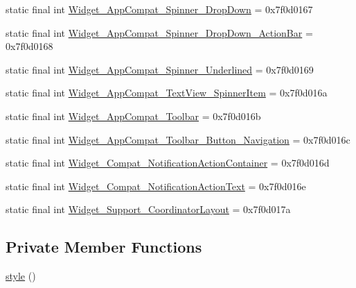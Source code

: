 \begin{DoxyCompactItemize}
\item 
static final int \mbox{\hyperlink{classandroid_1_1support_1_1v7_1_1appcompat_1_1_r_1_1style_a0911e8d3f56d1ceca6ee2f3e4dd58a57}{Widget\+\_\+\+App\+Compat\+\_\+\+Spinner\+\_\+\+Drop\+Down}} = 0x7f0d0167
\item 
static final int \mbox{\hyperlink{classandroid_1_1support_1_1v7_1_1appcompat_1_1_r_1_1style_a6190a954e4f0646a2b8de6530e0bcd72}{Widget\+\_\+\+App\+Compat\+\_\+\+Spinner\+\_\+\+Drop\+Down\+\_\+\+Action\+Bar}} = 0x7f0d0168
\item 
static final int \mbox{\hyperlink{classandroid_1_1support_1_1v7_1_1appcompat_1_1_r_1_1style_a185580641a1c211d234fd6a381680890}{Widget\+\_\+\+App\+Compat\+\_\+\+Spinner\+\_\+\+Underlined}} = 0x7f0d0169
\item 
static final int \mbox{\hyperlink{classandroid_1_1support_1_1v7_1_1appcompat_1_1_r_1_1style_ae78217806d80f6d12c6be69d442ec4aa}{Widget\+\_\+\+App\+Compat\+\_\+\+Text\+View\+\_\+\+Spinner\+Item}} = 0x7f0d016a
\item 
static final int \mbox{\hyperlink{classandroid_1_1support_1_1v7_1_1appcompat_1_1_r_1_1style_a09461e6cdfb963d2621f721c73f9c64d}{Widget\+\_\+\+App\+Compat\+\_\+\+Toolbar}} = 0x7f0d016b
\item 
static final int \mbox{\hyperlink{classandroid_1_1support_1_1v7_1_1appcompat_1_1_r_1_1style_ab210292245646fce123ac455b8fa3870}{Widget\+\_\+\+App\+Compat\+\_\+\+Toolbar\+\_\+\+Button\+\_\+\+Navigation}} = 0x7f0d016c
\item 
static final int \mbox{\hyperlink{classandroid_1_1support_1_1v7_1_1appcompat_1_1_r_1_1style_a1633e6362d69dd329e83c61ab99560f6}{Widget\+\_\+\+Compat\+\_\+\+Notification\+Action\+Container}} = 0x7f0d016d
\item 
static final int \mbox{\hyperlink{classandroid_1_1support_1_1v7_1_1appcompat_1_1_r_1_1style_a18e9124d71139940e68076f3be26805b}{Widget\+\_\+\+Compat\+\_\+\+Notification\+Action\+Text}} = 0x7f0d016e
\item 
static final int \mbox{\hyperlink{classandroid_1_1support_1_1v7_1_1appcompat_1_1_r_1_1style_a423ec154d1ddfd6adbe6d0971ad080e3}{Widget\+\_\+\+Support\+\_\+\+Coordinator\+Layout}} = 0x7f0d017a
\end{DoxyCompactItemize}
\subsection*{Private Member Functions}
\begin{DoxyCompactItemize}
\item 
\mbox{\hyperlink{classandroid_1_1support_1_1v7_1_1appcompat_1_1_r_1_1style_a0b1450d48bebe8085e1a935b4de26830}{style}} ()
\end{DoxyCompactItemize}


